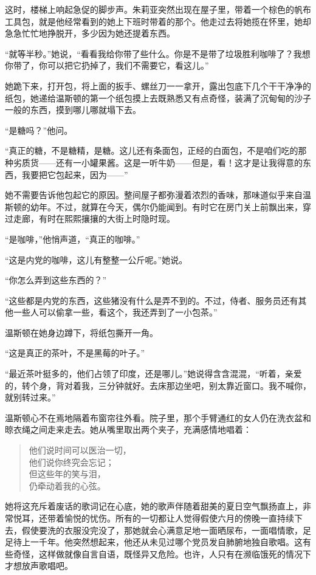 这时，楼梯上响起急促的脚步声。朱莉亚突然出现在屋子里，带着一个棕色的帆布工具包，就是他经常看到的她上下班时带着的那个。他走过去将她揽在怀里，她却急急忙忙地挣脱开，多少因为她还提着东西。

``就等半秒。''她说，``看看我给你带了些什么。你是不是带了垃圾胜利咖啡了？我想你带了，你可以把它扔掉了，我们不需要它，看这儿。''

她跪下来，打开包，将上面的扳手、螺丝刀一一拿开，露出包底下几个干干净净的纸包，她递给温斯顿的第一个纸包摸上去既熟悉又有点奇怪，装满了沉甸甸的沙子一般的东西，摸到哪儿哪就塌下去。

``是糖吗？''他问。

``真正的糖，不是糖精，是糖。这儿还有条面包，正经的白面包，不是咱们吃的那种劣质货——还有一小罐果酱。这是一听牛奶——但是，看！这才是让我得意的东西，我要把它包起来，因为——''

她不需要告诉他包起它的原因。整间屋子都弥漫着浓烈的香味，那味道似乎来自温斯顿的幼年。不过，就算在今天，偶尔仍能闻到。有时它在房门关上前飘出来，穿过走廊，有时在熙熙攘攘的大街上时隐时现。

``是咖啡，''他悄声道，``真正的咖啡。''

``这是内党的咖啡，这儿有整整一公斤呢。''她说。

``你怎么弄到这些东西的？''

``这些都是内党的东西，这些猪没有什么是弄不到的。不过，侍者、服务员还有其他一些人可以偷拿一些，看这个，我还弄到了一小包茶。''

温斯顿在她身边蹲下，将纸包撕开一角。

``这是真正的茶叶，不是黑莓的叶子。''

``最近茶叶挺多的，他们占领了印度，还是哪儿。''她说得含含混混，``听着，亲爱的，转个身，背对着我，三分钟就好。去床那边坐吧，别太靠近窗口。我不喊你，就别转过来。''

温斯顿心不在焉地隔着布窗帘往外看。院子里，那个手臂通红的女人仍在洗衣盆和晾衣绳之间走来走去。她从嘴里取出两个夹子，充满感情地唱着：

\begin{quotation}
\noindent 他们说时间可以医治一切，\\
他们说你终究会忘记；\\
但这些年的笑与泪，\\
仍牵动着我的心弦。
\end{quotation}


她将这充斥着废话的歌词记在心底，她的歌声伴随着甜美的夏日空气飘扬直上，非常悦耳，还带着愉悦的忧伤。所有的一切都让人觉得假使六月的傍晚一直持续下去，假使要洗的衣服没完没了，那她就会心满意足地一面晒尿布，一面唱情歌，足足待上一千年。他突然想起来，他还从未见过哪个党员发自肺腑地独自歌唱。这有些奇怪，这样做就像自言自语，既怪异又危险。也许，人只有在濒临饿死的情况下才想放声歌唱吧。

